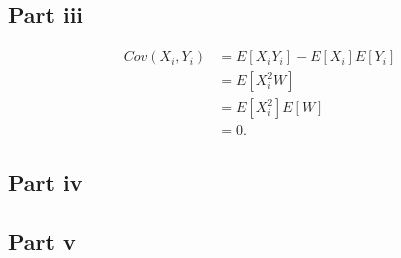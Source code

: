 \documentclass[11pt]{article} %
\begin{document}
\subsection{Part iii}
\begin{align*}
Cov(X_i,Y_i) &= E[X_iY_i] - E[X_i] E[Y_i]\\
&= E[X_i^2 W]\\
&= E[X_i^2]E[W]\\
&= 0.
\end{align*}
\subsection{Part iv}
\subsection{Part v}
\end{document}
